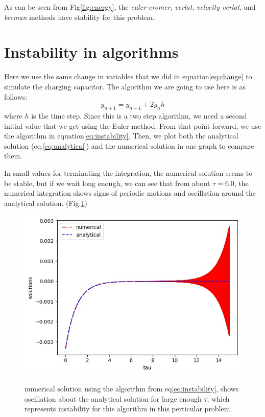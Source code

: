 \documentclass[12pt, a4paper]{article}
\begin{document}
	As can be seen from Fig\ref{fig:energy}, the \emph{euler-cromer}, \emph{verlat}, \emph{velocity verlat}, and \emph{beeman} methods have stability for this
	problem.
	
	\section{Instability in algorithms}
	Here we use the same change in variables that we did in equation\ref{eq:change} to simulate the charging capacitor.
	The algorithm we are going to use here is as follows:
	\begin{equation} \label{eq:instability}
		y_{n + 1} = y_{n - 1} + 2 \dot{y}_n h
	\end{equation}
	where $h$ is the time step. Since this is a two step algorithm, we need a second initial value that we get using the Euler method. From that point
	forward, we use the algorithm in equation\ref{eq:instability}. Then, we plot both the analytical solution (eq.\ref{eq:analytical}) and the 
	numerical solution in one graph to compare them.
	
	In small values for terminating the integration, the numerical solution seems to be stable, but if we wait long enough, we can see that
	from about $\tau = 6.0$, the numerical integration shows signs of periodic motions and oscillation around the analytical solution. 
	(Fig.\ref{fig:instability})
	\begin{figure}[h!]
		\centering
		\includegraphics[width=0.8\linewidth]{../p3/instability.jpg}
		\label{fig:instability}
		\caption{numerical solution using the algorithm from eq\ref{eq:instability}, shows oscillation about the analytical solution for 
			large enough $\tau$, which represents instability for this algorithm in this perticular problem.}
	\end{figure}
\end{document}
